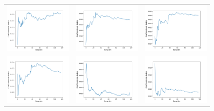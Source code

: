 \begin{figure}[h!]
\begin{tabular}{ccc}
        \includegraphics[width=4cm]{../Plots/dl_epoch_9.png} &
        \includegraphics[width=4cm]{../Plots/dl_epoch_10.png} &
        \includegraphics[width=4cm]{../Plots/dl_epoch_11.png} \\

        \includegraphics[width=4cm]{../Plots/dl_epoch_12.png} &
        \includegraphics[width=4cm]{../Plots/dl_epoch_13.png} &
        \includegraphics[width=4cm]{../Plots/dl_epoch_14.png} \\


\end{tabular}
\end{figure}
